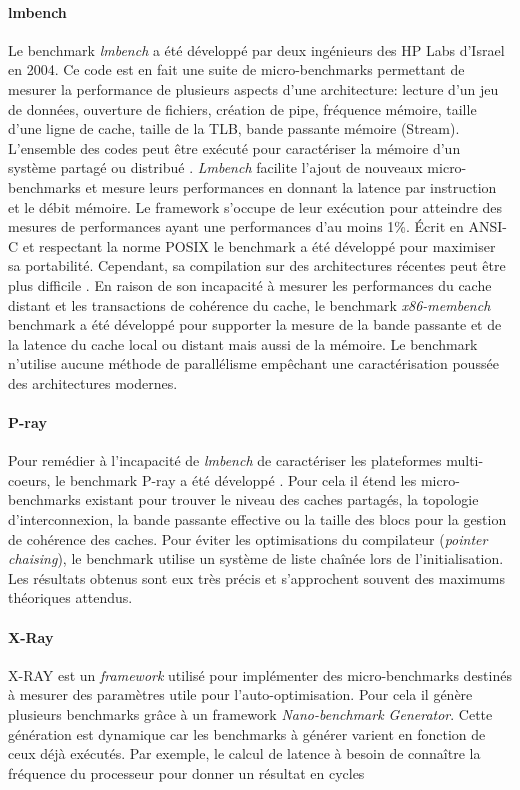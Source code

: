     \paragraph{lmbench} 
        Le benchmark \textit{lmbench}\cite{Staelin2004} a été développé par deux ingénieurs des HP Labs d'Israel en 2004. Ce code est en fait une suite de micro-benchmarks permettant de mesurer la performance de plusieurs aspects d'une architecture: lecture d'un jeu de données, ouverture de fichiers, création de pipe, fréquence mémoire, taille d'une ligne de cache, taille de la TLB, bande passante mémoire (Stream). L'ensemble des codes peut être exécuté pour caractériser la mémoire d'un système partagé ou distribué \cite{Staelin2002}.
        \textit{Lmbench} facilite l'ajout de nouveaux micro-benchmarks et mesure leurs performances en donnant la latence par instruction et le débit mémoire. Le framework s'occupe de leur exécution pour atteindre des mesures de performances ayant une performances d'au moins 1\%. Écrit en ANSI-C et respectant la norme POSIX le benchmark a été développé pour maximiser sa portabilité. Cependant, sa compilation sur des architectures récentes peut être plus difficile \cite{Yotov2004}. En raison de son incapacité à mesurer les performances du cache distant et les transactions de cohérence du cache, le benchmark \textit{x86-membench} benchmark \cite{Molka2017b} a été développé pour supporter la mesure de la bande passante et de la latence du cache local ou distant mais aussi de la mémoire. Le benchmark n'utilise aucune méthode de parallélisme empêchant une caractérisation poussée des architectures modernes. 
        
    
    \paragraph{P-ray} 
        Pour remédier à l'incapacité de \textit{lmbench} de caractériser les plateformes multi-coeurs, le benchmark P-ray a été développé \cite{Duchateau2008}. Pour cela il étend les micro-benchmarks existant pour trouver le niveau des caches partagés, la topologie d’interconnexion, la bande passante effective ou la taille des blocs pour la gestion de cohérence des caches. Pour éviter les optimisations du compilateur (\textit{pointer chaising}), le benchmark utilise un système de liste chaînée lors de l'initialisation. Les résultats obtenus sont eux très précis et s'approchent souvent des maximums théoriques attendus.

    \paragraph{X-Ray} X-RAY \cite{Yotov2004} est un \textit{framework} utilisé pour implémenter des micro-benchmarks destinés à mesurer des paramètres utile pour l’auto-optimisation. Pour cela il génère plusieurs benchmarks grâce à un framework \textit{Nano-benchmark Generator}. Cette génération est dynamique car les benchmarks à générer varient en fonction de ceux déjà exécutés. Par exemple, le calcul de latence à besoin de connaître la fréquence du processeur pour donner un résultat en cycles

